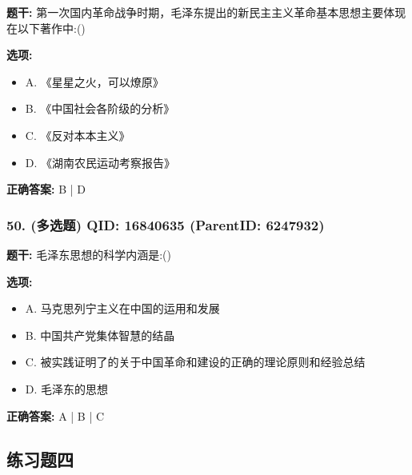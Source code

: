 \documentclass[12pt,UTF8]{ctexart}
\begin{document}
\textbf{题干:}
第一次国内革命战争时期，毛泽东提出的新民主主义革命基本思想主要体现在以下著作中:()



\textbf{选项:}
\begin{itemize}[leftmargin=*]

  \item A. 《星星之火，可以燎原》

  \item B. 《中国社会各阶级的分析》

  \item C. 《反对本本主义》

  \item D. 《湖南农民运动考察报告》

\end{itemize}

\textbf{正确答案:}
B | D

\vspace{0.3em}\hrulefill\vspace{0.7em}

\subsubsection*{50. (多选题) \small QID: 16840635 (ParentID: 6247932)}

\textbf{题干:}
毛泽东思想的科学内涵是:()



\textbf{选项:}
\begin{itemize}[leftmargin=*]

  \item A. 马克思列宁主义在中国的运用和发展

  \item B. 中国共产党集体智慧的结晶

  \item C. 被实践证明了的关于中国革命和建设的正确的理论原则和经验总结

  \item D. 毛泽东的思想

\end{itemize}

\textbf{正确答案:}
A | B | C

\vspace{0.3em}\hrulefill\vspace{0.7em}

\subsection*{练习题四}
\end{document}
